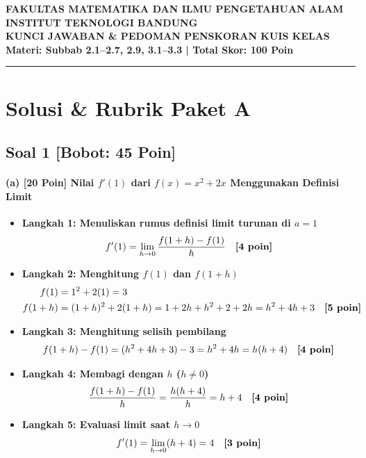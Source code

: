 \documentclass[11pt,a4paper]{article}
\begin{document}
\begin{center}
    {\large \textbf{FAKULTAS MATEMATIKA DAN ILMU PENGETAHUAN ALAM}}\\
    {\large \textbf{INSTITUT TEKNOLOGI BANDUNG}}\\[4pt]
    {\large \textbf{\color{ITBblue}KUNCI JAWABAN \& PEDOMAN PENSKORAN KUIS KELAS}}\\[2pt]
    \textbf{Materi: Subbab 2.1--2.7, 2.9, 3.1--3.3 \quad | \quad Total Skor: 100 Poin}
\end{center}

\vspace{6pt}
\hrule
\vspace{10pt}

\section*{Solusi \& Rubrik Paket A}

\subsection*{Soal 1 [Bobot: 45 Poin]}

\paragraph{(a) [20 Poin] Nilai $f'(1)$ dari $f(x) = x^2 + 2x$ Menggunakan Definisi Limit}
\begin{itemize}[leftmargin=18pt]
    \item \textbf{Langkah 1: Menuliskan rumus definisi limit turunan di $a = 1$}
    \[
    f'(1) = \lim_{h \to 0} \frac{f(1+h) - f(1)}{h} \quad \text{\textbf{[4 poin]}}
    \]
    \item \textbf{Langkah 2: Menghitung $f(1)$ dan $f(1+h)$}
    \begin{align*}
        f(1) &= 1^2 + 2(1) = 3 \\
        f(1+h) &= (1+h)^2 + 2(1+h) = 1 + 2h + h^2 + 2 + 2h = h^2 + 4h + 3 \quad \text{\textbf{[5 poin]}}
    \end{align*}
    \item \textbf{Langkah 3: Menghitung selisih pembilang}
    \[
    f(1+h) - f(1) = (h^2 + 4h + 3) - 3 = h^2 + 4h = h(h + 4) \quad \text{\textbf{[4 poin]}}
    \]
    \item \textbf{Langkah 4: Membagi dengan $h$ ($h \neq 0$)}
    \[
    \frac{f(1+h) - f(1)}{h} = \frac{h(h+4)}{h} = h + 4 \quad \text{\textbf{[4 poin]}}
    \]
    \item \textbf{Langkah 5: Evaluasi limit saat $h \to 0$}
    \[
    f'(1) = \lim_{h \to 0} (h + 4) = 4 \quad \text{\textbf{[3 poin]}}
    \]
\end{itemize}
\end{document}
